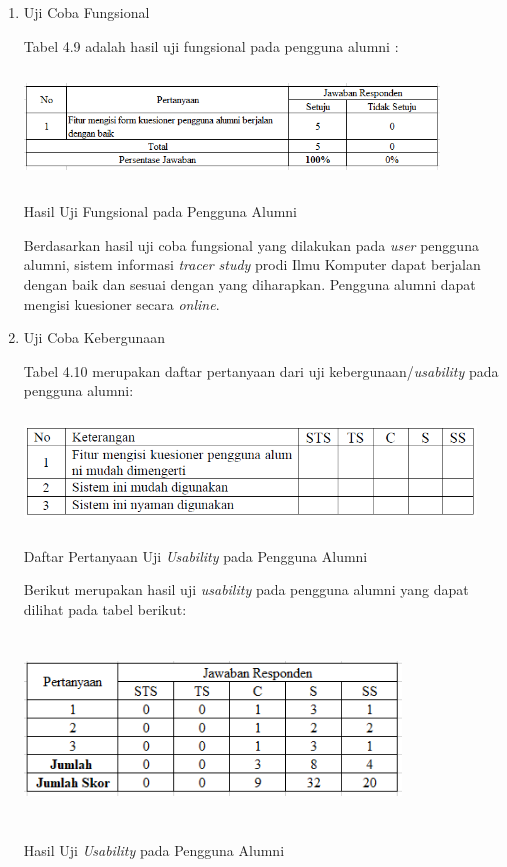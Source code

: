 \begin{enumerate}
	\item Uji Coba Fungsional
	
	Tabel 4.9 adalah hasil uji fungsional pada pengguna alumni :
	
	\begin{table}[H]
		\centering
		\includegraphics[width=11cm,height=3cm]{gambar/UAT/f_pengguna}
		\caption{Hasil Uji Fungsional pada Pengguna Alumni}
		\label{f_pengguna}
	\end{table}
	
	Berdasarkan hasil uji coba fungsional yang dilakukan pada \textit{user} pengguna alumni, sistem informasi
	\textit{tracer study} prodi Ilmu Komputer dapat berjalan dengan baik dan sesuai dengan yang diharapkan. Pengguna alumni dapat mengisi kuesioner secara \textit{online}.
	
	\item Uji Coba Kebergunaan
	
	Tabel 4.10 merupakan daftar pertanyaan dari uji kebergunaan/\textit{usability} pada pengguna alumni:
	
	\begin{table}[H]
		\centering
		\includegraphics[width=12cm,height=3cm]{gambar/UAT/u_pengguna}
		\caption{Daftar Pertanyaan Uji \textit{Usability} pada Pengguna Alumni}
		\label{u_pengguna}
	\end{table}
	
	Berikut merupakan hasil uji \textit{usability} pada pengguna alumni yang dapat dilihat pada tabel berikut:
	
	\begin{table}[H]
		\centering
		\includegraphics[width=10cm,height=5cm]{gambar/UAT/hasil_u_pengguna}
		\caption{Hasil Uji \textit{Usability} pada Pengguna Alumni}
		\label{h_u_pengguna}
	\end{table}
	

\end{enumerate}
